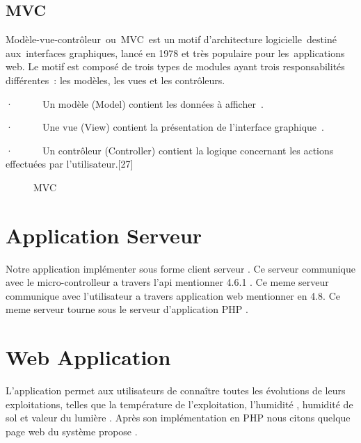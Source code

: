 \newpage
\subsection{MVC}
Modèle-vue-contrôleur ou MVC est un motif d'architecture logicielle destiné aux interfaces graphiques, lancé en 1978 et très populaire pour les applications web. Le motif est composé de trois types de modules ayant trois responsabilités différentes : les modèles, les vues et les contrôleurs.

·      Un modèle (Model) contient les données à afficher .

·      Une vue (View) contient la présentation de l'interface graphique .

·      Un contrôleur (Controller) contient la logique concernant les actions effectuées par l'utilisateur.[27]


\begin{figure}[hbt]
\centering
\right
\label{fig: MVC }

  \caption{MVC}
\end{figure}
\section{Application Serveur}
Notre application implémenter sous forme client serveur . Ce serveur communique avec le micro-controlleur a travers l’api mentionner 4.6.1 . Ce meme serveur communique avec l’utilisateur a travers application web mentionner en 4.8. Ce meme serveur tourne sous le serveur d’application PHP . 
\section{Web Application}
L'application permet aux utilisateurs de connaître toutes les évolutions de leurs exploitations, telles que la température de l'exploitation, l'humidité , humidité de  sol et valeur du lumière . Après son implémentation  en PHP nous citons quelque page web du système propose .
\newpage
